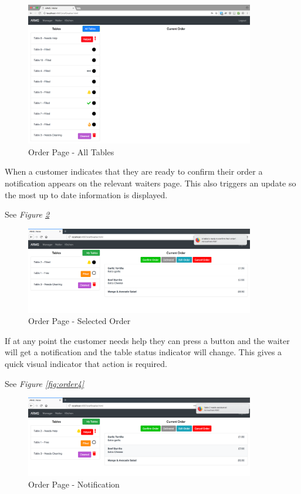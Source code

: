\documentclass[12pt, twoside, a4paper]{report}
\begin{document}
\begin{figure}[H]
  \centering
  \includegraphics[width=10cm]{orders2.png}
  \caption{Order Page - All Tables}
  \label{fig:orders2}
\end{figure}

When a customer indicates that they are ready to confirm their order a notification appears on the relevant waiters page. This also triggers an update so the most up to date information is displayed.

See \textit{Figure \ref{fig:orders3}}

\begin{figure}[H]
  \centering
  \includegraphics[width=10cm]{orders3.png}
  \caption{Order Page - Selected Order}
  \label{fig:orders3}
\end{figure}

If at any point the customer needs help they can press a button and the waiter will get a notification and the table status indicator will change. This gives a quick visual indicator that action is required.

See \textit{Figure \ref{fig:order4}}

\begin{figure}[H]
  \centering
  \includegraphics[width=10cm]{orders4.png}
  \caption{Order Page - Notification}
  \label{fig:orders4}
\end{figure}
\end{document}
